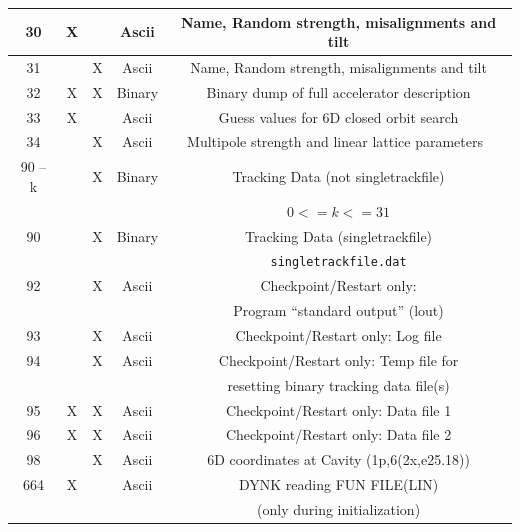 \documentclass[a4paper,11pt]{report}
\begin{document}
\begin{center}
\begin{longtable}{|c|c|c|c|c|}
  \hline \rule[-3.75mm]{0mm}{10mm}
  30 & X & & Ascii & Name, Random strength, misalignments and tilt \\
  \hline \rule[-3.75mm]{0mm}{10mm}
  31 & & X & Ascii & Name, Random strength, misalignments and tilt \\
  \hline \rule[-3.75mm]{0mm}{10mm}
  32 & X & X & Binary & Binary dump of full accelerator description \\
  \hline \rule[-3.75mm]{0mm}{10mm}
  33 & X & & Ascii & Guess values for 6D closed orbit search \\
  \hline \rule[-3.75mm]{0mm}{10mm}
  34 & & X & Ascii & Multipole strength and linear lattice
    parameters~\cite{SODD} \\ 
  \hline \rule[-1.25mm]{0mm}{7.5mm}
  90 -- k & & X & Binary & Tracking Data (not singletrackfile)\\*
  \rule[-3.7mm]{0mm}{7.5mm}
  & & & & $ 0 <= k <= 31 $\\
  \hline \rule[-1.25mm]{0mm}{7.5mm}
  90 & & X & Binary & Tracking Data (singletrackfile)\\*
  \rule[-3.7mm]{0mm}{7.5mm}
  & & & & \texttt{singletrackfile.dat}\\
  \hline \rule[-3.75mm]{0mm}{10mm}
  92 & & X & Ascii & Checkpoint/Restart only: \\*
  \rule[-3.7mm]{0mm}{7.5mm}
  & & & & Program ``standard output'' (lout) \\
  \hline \rule[-3.75mm]{0mm}{10mm}
  93 & & X & Ascii & Checkpoint/Restart only: Log file \\
  \hline \rule[-3.75mm]{0mm}{10mm}
  94 & & X & Ascii & Checkpoint/Restart only: Temp file for \\* 
  \rule[-3.7mm]{0mm}{7.5mm}
  & & & &resetting binary tracking data file(s) \\
  \hline \rule[-3.75mm]{0mm}{10mm}
  95 & X & X & Ascii & Checkpoint/Restart only: Data file 1 \\
  \hline \rule[-3.75mm]{0mm}{10mm}
  96 & X & X & Ascii & Checkpoint/Restart only: Data file 2 \\
  \hline \rule[-3.75mm]{0mm}{10mm}
  98 & & X & Ascii & 6D coordinates at Cavity (1p,6(2x,e25.18)) \\
  \hline \rule[-3.75mm]{0mm}{10mm}
  664 & X &  & Ascii & DYNK reading FUN FILE(LIN) \\*
  \rule[-3.7mm]{0mm}{7.5mm}
  & & & & (only during initialization) \\

\end{longtable}
\end{center}
\end{document}

